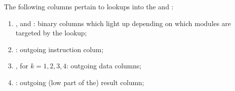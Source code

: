 The following columns pertain to lookups into the \wcpMod{} and \addMod{}:
\begin{enumerate}[resume]
	\item \wcpFlag{}, \addFlag{} and \modFlag{}:
		binary columns which light up depending on which modules are targeted by the lookup;
	\item \outgoingInst{}:
		outgoing instruction colum;
	\item {}, for $k = 1, 2, 3, 4$:
		outgoing data columns;
	\item \outgoingResLo{}:
		outgoing (low part of the) result column;
\end{enumerate}
